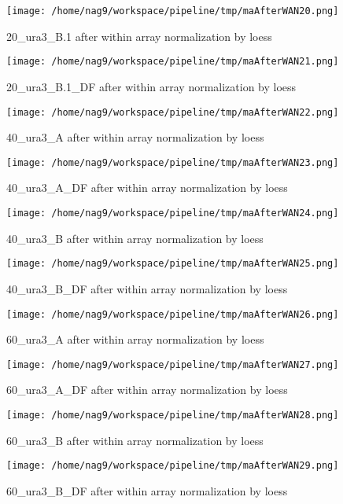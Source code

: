 \documentclass[titlepage]{article}
\begin{document}
\begin{figure}[htb!]
\centering\texttt{[image: /home/nag9/workspace/pipeline/tmp/maAfterWAN20.png]}
\caption{20\_ura3\_B.1 after within array normalization by loess}
 \end{figure}\pagebreak
\begin{figure}[htb!]
\centering\texttt{[image: /home/nag9/workspace/pipeline/tmp/maAfterWAN21.png]}
\caption{20\_ura3\_B.1\_DF after within array normalization by loess}
 \end{figure}\pagebreak
\begin{figure}[htb!]
\centering\texttt{[image: /home/nag9/workspace/pipeline/tmp/maAfterWAN22.png]}
\caption{40\_ura3\_A after within array normalization by loess}
 \end{figure}\pagebreak
\begin{figure}[htb!]
\centering\texttt{[image: /home/nag9/workspace/pipeline/tmp/maAfterWAN23.png]}
\caption{40\_ura3\_A\_DF after within array normalization by loess}
 \end{figure}\pagebreak
\begin{figure}[htb!]
\centering\texttt{[image: /home/nag9/workspace/pipeline/tmp/maAfterWAN24.png]}
\caption{40\_ura3\_B after within array normalization by loess}
 \end{figure}\pagebreak
\begin{figure}[htb!]
\centering\texttt{[image: /home/nag9/workspace/pipeline/tmp/maAfterWAN25.png]}
\caption{40\_ura3\_B\_DF after within array normalization by loess}
 \end{figure}\pagebreak
\begin{figure}[htb!]
\centering\texttt{[image: /home/nag9/workspace/pipeline/tmp/maAfterWAN26.png]}
\caption{60\_ura3\_A after within array normalization by loess}
 \end{figure}\pagebreak
\begin{figure}[htb!]
\centering\texttt{[image: /home/nag9/workspace/pipeline/tmp/maAfterWAN27.png]}
\caption{60\_ura3\_A\_DF after within array normalization by loess}
 \end{figure}\pagebreak
\begin{figure}[htb!]
\centering\texttt{[image: /home/nag9/workspace/pipeline/tmp/maAfterWAN28.png]}
\caption{60\_ura3\_B after within array normalization by loess}
 \end{figure}\pagebreak
\begin{figure}[htb!]
\centering\texttt{[image: /home/nag9/workspace/pipeline/tmp/maAfterWAN29.png]}
\caption{60\_ura3\_B\_DF after within array normalization by loess}
 \end{figure}\pagebreak
\end{document}
